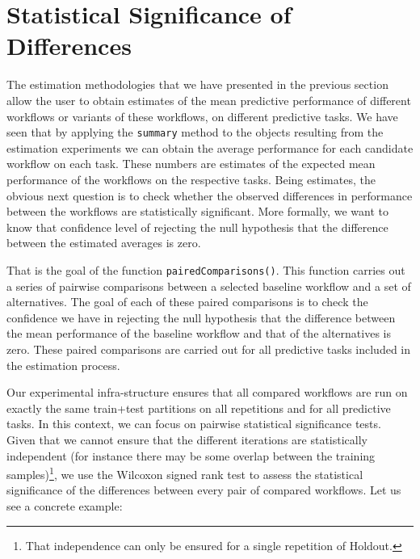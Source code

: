 \documentclass[10pt,a4paper]{article}\usepackage[]{graphicx}\usepackage[]{color}
\begin{document}
\section{Statistical Significance of Differences}

The estimation methodologies that we have presented in the previous
section allow the user to obtain estimates of the mean predictive
performance of different workflows or variants of these workflows, on
different predictive tasks. We have seen that by applying the
\texttt{summary} method to the objects resulting from the estimation experiments
we can obtain the average performance for each candidate workflow on
each task. These numbers are estimates of the expected mean
performance of the workflows on the respective tasks. Being estimates,
the obvious next question is to check whether the observed differences
in performance between the workflows are statistically
significant. More formally, we want to know that confidence level of rejecting the null hypothesis that the difference between the estimated averages is zero.

That is the goal of the function
\texttt{pairedComparisons()}. This function carries out a series of pairwise
comparisons between a selected baseline workflow and a set of alternatives. The goal of each of these paired comparisons is to check the confidence we have in rejecting the null hypothesis that the difference between the mean performance of the baseline workflow and that of the alternatives is zero. These paired comparisons are carried out for all predictive tasks included in the estimation process.

Our experimental infra-structure ensures that all compared workflows
are run on exactly the same train+test partitions on all repetitions and
for all predictive tasks. In this context, we can focus on pairwise
statistical significance tests. Given that we cannot ensure that the
different iterations are statistically independent (for instance there
may be some overlap between the training samples)\footnote{That independence can only be ensured  for a single repetition of Holdout.}, we use the Wilcoxon
signed rank test to assess the statistical significance of the
differences between every pair of compared workflows. Let us see a
concrete example:
\end{document}
